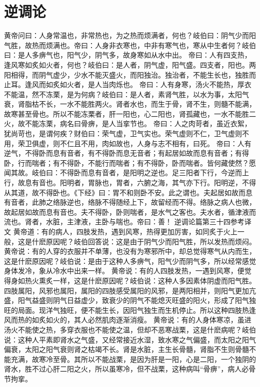 \documentclass[a4paper,12pt,UTF8,twoside]{ctexbook}
\begin{document}
\chapter{逆调论}
黄帝问曰：人身常温也，非常热也，为之热而烦满者，何也？岐伯曰：阴气少而阳气胜，故热而烦满也。帝曰：人身非衣寒也，中非有寒气也，寒从中生者何？岐伯曰：是人多痹气也，阳气少，阴气多，故身寒如从水中出。
帝曰：人有四支热，逢风寒如炙如火者，何也？岐伯曰：是人者，阴气虚，阳气盛。四支者，阳也。两阳相得，而阴气虚少，少水不能灭盛火，而阳独治。独治者，不能生长也，独胜而止耳。逢风而如炙如火者，是人当肉烁也。
帝曰：人有身寒，汤火不能热，厚衣不能温，然不冻栗，是为何病？岐伯曰：是人者，素肾气胜，以水为事，太阳气衰，肾脂枯不长，一水不能胜两火。肾者水也，而生于骨，肾不生，则髓不能满，故寒甚至骨也。所以不能冻栗者，肝一阳也，心二阳也，肾孤藏也，一水不能胜二火，故不能冻栗，病名曰骨痹，是人当挛节也。
帝曰：人之肉苛者，虽近衣絮，犹尚苛也，是谓何疾？财伯曰：荣气虚，卫气实也。荣气虚则不仁，卫气虚则不用，荣卫俱虚，则不仁且不用，肉如故也，人身与志不相有，曰死。
帝曰：人有逆气，不得卧而息有音者，有不得卧而息无音者；有起居如故而息有音者；有得卧，行而喘者；有不得卧，不能行而喘者；有不得卧，卧而喘者。皆何藏使然？愿闻其故。岐伯曰：不得卧而息有音者，是阳明之逆也。足三阳者下行，今逆而上行，故息有音也。阳明者，胃脉也，胃者，六腑之海，其气亦下行。阳明逆，不得从其道，故不得卧也。《下经》曰：胃不和则卧不安。此之谓也。夫起居如故而息有音者，此肺之络脉逆也，络脉不得随经上下，故留经而不得。络脉之病人也微，故起居如故而息有音也。夫不得卧，卧则喘者，是水气之客也。夫水者，循津液而流也。肾者，水脏，主津液，主卧与喘也。帝曰：善！
逆调论篇第三十四参考译文
黄帝道：有的病人，四肢发热，遇到风寒，热得更加厉害，如同炙于火上一般，这是什麽原因呢？岐伯回答说：这是由于阴气少而阳气胜，所以发热而烦闷。黄帝说：有的人穿的衣服并不单薄，也没有为寒邪所中，却总觉得寒气从内而生，这是什麽原因呢？岐伯说：是由于这种人多痹气，阳气少而阴气多，所以经常感觉身体发冷，象从冷水中出来一样。
黄帝说：有的人四肢发热，一遇到风寒，便觉得身如热火熏炙一样，这是什麽原因呢？岐伯说：这种人多因素体阴虚而阳气胜。四肢属阳，风邪也属阳，属阳的四肢感受属阳的风邪，是两阳相并，则阳气更加亢盛，阳气益盛则阴气日益虚少，致衰少的阴气不能熄灭旺盛的阳火，形成了阳气独旺的局面。现洋气独旺，便不能生长，因阳气独生而生机停止。所以这种四肢热逢风而热的如炙如火的，其人必然肌肉逐渐消瘦。
黄帝说：有的人身体寒凉，虽进汤火不能使之热，多穿衣服也不能使之温，但却不恶寒战栗，这是什麽病呢？岐伯说：这种人平素即肾水之气盛，又经常接近水湿，致水寒之气偏盛，而太阳之阳气偏衰，太阳之阳气衰则肾之枯竭不长。肾是水脏，主生长骨髓，肾脂不生则骨髓不能充满，故寒冷至骨。其所以不能战栗，是因为肝是一阳，心是二阳，一个独阴的肾水，胜不过心肝二阳之火，所以虽寒冷，但不战栗，这种病叫“骨痹”，病人必骨节拘挛。
\end{document}
